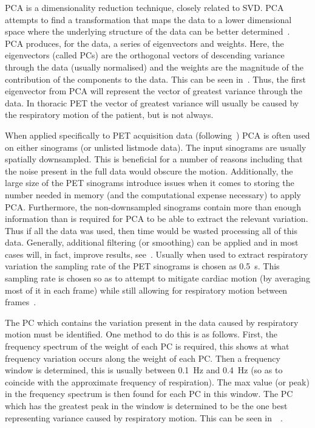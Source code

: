                \gls{PCA} is a dimensionality reduction technique, closely related to \gls{SVD}. \gls{PCA} attempts to find a transformation that maps the data to a lower dimensional space where the underlying structure of the data can be better determined~\parencite{Pearson1901OnSpace}. \gls{PCA} produces, for the data, a series of eigenvectors and weights. Here, the eigenvectors (called \glspl{PC}) are the orthogonal vectors of descending variance through the data (usually normalised) and the weights are the magnitude of the contribution of the components to the data. This can be seen in~. Thus, the first eigenvector from \gls{PCA} will represent the vector of greatest variance through the data. In thoracic \gls{PET} the vector of greatest variance will usually be caused by the respiratory motion of the patient, but is not always.
                
                When applied specifically to \gls{PET} acquisition data (following~\parencite{Thielemans2011}) \gls{PCA} is often used on either sinograms (or unlisted listmode data). The input sinograms are usually spatially downsampled. This is beneficial for a number of reasons including that the noise present in the full data would obscure the motion. Additionally, the large size of the \gls{PET} sinograms introduce issues when it comes to storing the number needed in memory (and the computational expense necessary) to apply \gls{PCA}. Furthermore, the non-downsampled sinograms contain more than enough information than is required for \gls{PCA} to be able to extract the relevant variation. Thus if all the data was used, then time would be wasted processing all of this data. Generally, additional filtering (or smoothing) can be applied and in most cases will, in fact, improve results, see~. Usually when used to extract respiratory variation the sampling rate of the \gls{PET} sinograms is chosen as \SI{0.5}{\second}. This sampling rate is chosen so as to attempt to mitigate cardiac motion (by averaging most of it in each frame) while still allowing for respiratory motion between frames~\parencite{Bertolli2018Data-DrivenTomography}.
                
                The \gls{PC} which contains the variation present in the data caused by respiratory motion must be identified. One method to do this is as follows. First, the frequency spectrum of the weight of each \gls{PC} is required, this shows at what frequency variation occurs along the weight of each \gls{PC}. Then a frequency window is determined, this is usually between \SI{0.1}{\hertz} and \SI{0.4}{\hertz} (so as to coincide with the approximate frequency of respiration). The max value (or peak) in the frequency spectrum is then found for each \gls{PC} in this window. The \gls{PC} which has the greatest peak in the window is determined to be the one best representing variance caused by respiratory motion. This can be seen in~~\parencite{Thielemans2011}.
                

